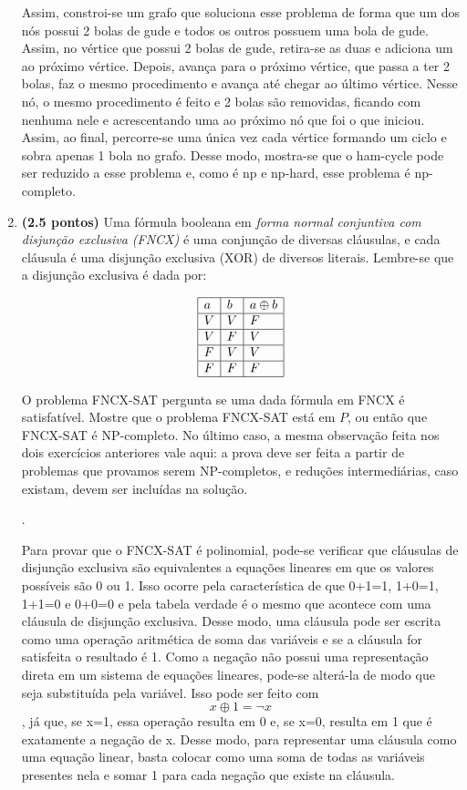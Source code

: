 \documentclass[12pt]{article}
\newcommand{\resposta}[1]{ \noindent {\bf Solução}.{\color{blue} #1}}
\begin{document}
\begin{enumerate}
{	Assim, constroi-se um grafo que soluciona esse problema de forma que um dos nós possui 2 bolas de gude e todos os outros possuem uma bola de gude. Assim, no vértice que possui 2 bolas de gude, retira-se as duas e adiciona um ao próximo vértice. Depois, avança para o próximo vértice, que passa a ter 2 bolas, faz o mesmo procedimento e avança até chegar ao último vértice. Nesse nó, o mesmo procedimento é feito e 2 bolas são removidas, ficando com nenhuma nele e acrescentando uma ao próximo nó que foi o que iniciou. Assim, ao final, percorre-se uma única vez cada vértice formando um ciclo e sobra apenas 1 bola no grafo. Desse modo, mostra-se que o ham-cycle pode ser reduzido a esse problema e, como é np e np-hard, esse problema é np-completo.
	
  }
  
\item {\bf (2.5 pontos)} Uma fórmula booleana em {\it forma normal conjuntiva com disjunção exclusiva (FNCX)} é uma conjunção de diversas cláusulas, e cada cláusula é uma disjunção exclusiva (XOR) de diversos literais. Lembre-se que a disjunção exclusiva é dada por:

  $$\begin{array}{|l|l|l|}\hline
      a & b & a \oplus b \\ \hline
      V & V & F \\ \hline
      V & F & V \\ \hline
      F & V & V \\ \hline
      F & F & F \\ \hline
  \end{array}$$

  O problema FNCX-SAT pergunta se uma dada fórmula em FNCX é
  satisfatível. Mostre que o problema FNCX-SAT está em $P$, ou então
  que FNCX-SAT é NP-completo. No último caso, a mesma observação feita
  nos dois exercícios anteriores vale aqui: a prova deve ser feita a
  partir de problemas que provamos serem NP-completos, e reduções
  intermediárias, caso existam, devem ser incluídas na solução.

  \resposta{
    Para provar que o FNCX-SAT é polinomial, pode-se verificar que cláusulas de disjunção exclusiva são equivalentes a equações lineares em que os valores possíveis são 0 ou 1. Isso ocorre pela característica de que 0+1=1, 1+0=1, 1+1=0 e 0+0=0 e pela tabela verdade é o mesmo que acontece com uma cláusula de disjunção exclusiva. Desse modo, uma cláusula pode ser escrita como uma operação aritmética de soma das variáveis e se a cláusula for satisfeita o resultado é 1. Como a negação não possui uma representação direta em um sistema de equações lineares, pode-se alterá-la de modo que seja substituída pela variável. Isso pode ser feito com $$ x \oplus 1 = \neg x$$, já que, se x=1, essa operação resulta em 0 e, se x=0, resulta em 1 que é exatamente a negação de x. Desse modo, para representar uma cláusula como uma equação linear, basta colocar como uma soma de todas as variáveis presentes nela e somar 1 para cada negação que existe na cláusula.

}
\end{enumerate}
\end{document}
